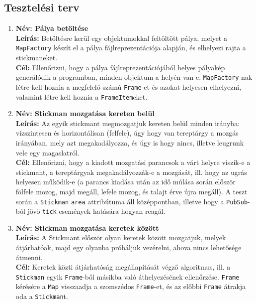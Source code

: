    	\subsection{Tesztelési terv}
			\newcommand{\testitem}[1]{\item \textbf{Név: #1}\\}
			\newcommand{\tdesc}[1]{\textbf{Leírás: } #1\\}
			\newcommand{\tcel}[1]{\textbf{Cél:} #1\\}
	
			\begin{enumerate}[label=\textbf{\arabic*.}, start=1]
		        
		        \testitem{Pálya betöltése}
		        \tdesc{Betöltésre kerül egy objektumokkal feltöltött pálya, melyet a \texttt{MapFactory} készít el a pálya fájlreprezentációja alapján, és elhelyezi rajta a stickmaneket.}
		        \tcel{Ellenőrizni, hogy a pálya fájlreprezentációjából helyes pályakép generálódik a programban, minden objektum a helyén van-e. \texttt{MapFactory}-nak létre kell hoznia a megfelelő számú \texttt{Frame}-et és azokat helyesen elhelyezni, valamint létre kell hoznia a \texttt{FrameItem}eket.}
		        
		        \testitem{Stickman mozgatása kereten belül}
		        \tdesc{Az egyik stickmant megmozgatjuk kereten belül minden irányba: vízszintesen és horizontálisan (felfele), úgy hogy van tereptárgy a mozgás irányában, mely azt megakadályozza, és úgy is hogy nincs, illetve leugrunk vele egy magaslatról.}
		        \tcel{Ellenőrizni, hogy a kiadott mozgatási parancsok a várt helyre viszik-e a stickmant, a tereptárgyak megakadályozzák-e a mozgását, ill. hogy az ugrás helyesen működik-e (a parancs kiadása után az idő múlása során először fölfele mozog, majd megáll, lefele mozog, és talajt érve újra megáll). A teszt során a \texttt{Stickman} \texttt{area} attribútuma áll középpontban, illetve hogy a \texttt{PubSub}-ból jövő \texttt{tick} események hatására hogyan reagál.}
		        
		        \testitem{Stickman mozgatása keretek között}
		        \tdesc{A Stickmant először olyan keretek között mozgatjuk, melyek átjárhatóak, majd egy olyanba próbáljuk vezérelni, ahova nincs lehetősége átmenni.}
		        \tcel{Keretek közti átjárhatóság megállapítását végző algoritmus, ill. a \texttt{Stickman} egyik \texttt{Frame}-ből másikba való áthelyezésének ellenőrzése. \texttt{Frame} kérésére a \texttt{Map} visszaadja a szomszédos \texttt{Frame}-et, és az előbbi \texttt{Frame} átrakja oda a \texttt{Stickman}t.}
		        

\end{enumerate}
